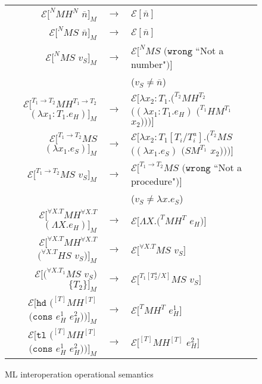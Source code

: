 \begin{figure}
\label{mios}
\caption{ML interoperation operational semantics}
\onehalfspacing
\begin{center}
\begin{tabular}{rcl}
$\mathscr{E}[^{N}MH^{N}$ $\overline{n}]_{M}$ & $\rightarrow$ & $\mathscr{E}[\overline{n}]$ \\
$\mathscr{E}[^{N}MS$ $\overline{n}]_{M}$ & $\rightarrow$ & $\mathscr{E}[\overline{n}]$ \\
$\mathscr{E}[^{N}MS$ $v_{S}]_{M}$ & $\rightarrow$ & $\mathscr{E}[^{N}MS$ $(\mathtt{wrong}$ ``Not a number"$)]$ \\
&& ($v_{S}\neq\overline{n}$) \\
$\mathscr{E}[^{T_{1}\rightarrow T_{2}}MH^{T_{1}\rightarrow T_{2}}$ $(\lambda x_{1}:T_{1}.e_{H})]_{M}$ & $\rightarrow$ & $\mathscr{E}[\lambda x_{2}:T_{1}.(^{T_{2}}MH^{T_{2}}$ $((\lambda x_{1}:T_{1}.e_{H})$ $(^{T_{1}}HM^{T_{1}}$ $x_{2})))]$ \\
$\mathscr{E}[^{T_{1}\rightarrow T_{2}}MS$ $(\lambda x_{1}.e_{S})]_{M}$ & $\rightarrow$ & $\mathscr{E}[\lambda x_{2}:T_{1}[T_{i}/T^{a}_{i}].(^{T_{2}}MS$ $((\lambda x_{1}.e_{S})$ $(SM^{T_{1}}$ $x_{2})))]$ \\
$\mathscr{E}[^{T_{1}\rightarrow T_{2}}MS$ $v_{S}]_{M}$ & $\rightarrow$ & $\mathscr{E}[^{T_{1}\rightarrow T_{2}}MS$ $(\mathtt{wrong}$ ``Not a procedure"$)]$ \\
&& ($v_{S}\neq\lambda x.e_{S}$) \\
$\mathscr{E}[^{\forall X.T}MH^{\forall X.T}$ $(\Lambda X.e_{H})]_{M}$ & $\rightarrow$ & $\mathscr{E}[\Lambda X.(^{T}MH^{T}$ $e_{H})]$ \\
$\mathscr{E}[^{\forall X.T}MH^{\forall X.T}$ $(^{\forall X.T}HS$ $v_{S})]_{M}$ & $\rightarrow$ & $\mathscr{E}[^{\forall X.T}MS$ $v_{S}]$ \\
$\mathscr{E}[(^{\forall X.T_{1}}MS$ $v_{S})$ $\lbrace T_{2}\rbrace]_{M}$ & $\rightarrow$ & $\mathscr{E}[^{T_{1}[T^{a}_{2}/X]}MS$ $v_{S}]$ \\
$\mathscr{E}[\mathtt{hd}$ $(^{[T]}MH^{[T]}$ $(\mathtt{cons}$ $e_{H}^{1}$ $e_{H}^{2}))]_{M}$ & $\rightarrow$ & $\mathscr{E}[^{T}MH^{T}$ $e_{H}^{1}]$ \\
$\mathscr{E}[\mathtt{tl}$ $(^{[T]}MH^{[T]}$ $(\mathtt{cons}$ $e_{H}^{1}$ $e_{H}^{2}))]_{M}$ & $\rightarrow$ & $\mathscr{E}[^{[T]}MH^{[T]}$ $e_{H}^{2}]$ \\

\end{tabular}
\end{center}
\end{figure}

